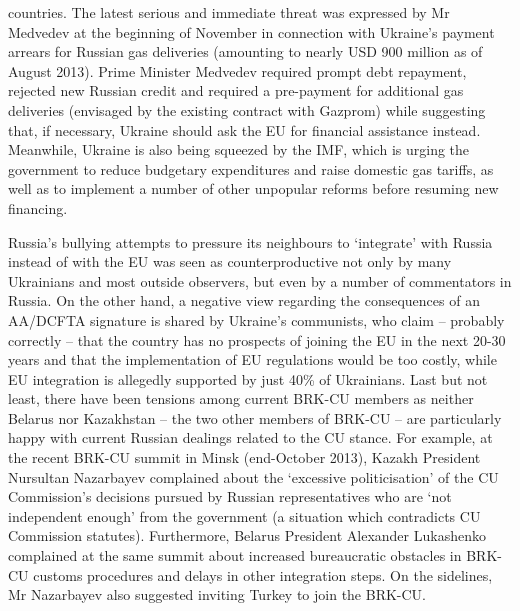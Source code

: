 countries. The latest serious and immediate threat was expressed by Mr Medvedev at the beginning of November in connection with Ukraine's payment arrears for Russian gas deliveries (amounting to nearly USD 900 million as of August 2013). Prime Minister Medvedev required prompt debt repayment, rejected new Russian credit and required a pre-payment for additional gas deliveries (envisaged by the existing contract with Gazprom) while suggesting that, if necessary, Ukraine should ask the EU for financial assistance instead. Meanwhile, Ukraine is also being squeezed by the IMF, which is urging the government to reduce budgetary expenditures and raise domestic gas tariffs, as well as to implement a number of other unpopular reforms before resuming new financing.  

Russia's bullying attempts to pressure its neighbours to `integrate' with Russia instead of with the EU was seen as counterproductive not only by many Ukrainians and most outside observers, but even by a number of commentators in Russia. On the other hand, a negative view regarding the consequences of an AA/DCFTA signature is shared by Ukraine's communists, who claim -- probably correctly -- that the country has no prospects of joining the EU in the next 20-30 years and that the implementation of EU regulations would be too costly, while EU integration is allegedly supported by just 40\% of Ukrainians. Last but not least, there have been tensions among current BRK-CU members as neither Belarus nor Kazakhstan -- the two other members of BRK-CU -- are particularly happy with current Russian dealings related to the CU stance. For example, at the recent BRK-CU summit in Minsk (end-October 2013), Kazakh President Nursultan Nazarbayev complained about the `excessive politicisation' of the CU Commission's decisions pursued by Russian representatives who are `not independent enough' from the government (a situation which contradicts CU Commission statutes). Furthermore, Belarus President Alexander Lukashenko complained at the same summit about increased bureaucratic obstacles in BRK-CU customs procedures and delays in other integration steps. On the sidelines, Mr Nazarbayev also suggested inviting Turkey to join the BRK-CU.


